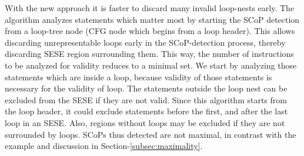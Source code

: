 \documentclass{sigplanconf}
\begin{document}
With the new approach it is faster to discard many invalid loop-nests early. The
algorithm analyzes statements which matter most by starting the SCoP detection
from a loop-tree node (CFG node which begins from a loop header). This allows
discarding unrepresentable loops early in the SCoP-detection process, thereby
discarding SESE region surrounding them.  This way, the number of instructions
to be analyzed for validity reduces to a minimal set.  We start by analyzing
those statements which are inside a loop, because validity of those statements
is necessary for the validity of loop.  The statements outside the loop nest can
be excluded from the SESE if they are not valid.  Since this algorithm starts
from the loop header, it could exclude statements before the first, and after
the last loop in an SESE.  Also, regions without loops may be excluded if they
are not surrounded by loops.  SCoPs thus detected are not maximal, in contrast
with the example and discussion in Section-\ref{subsec:maximality}.


\end{document}
